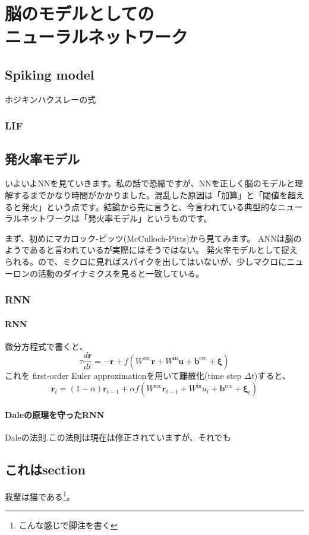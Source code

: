 \documentclass[11pt,dvipdfmx,b5paper,oneside]{jsbook}
\begin{document}
\chapter{脳のモデルとしての\\ニューラルネットワーク}
\section{Spiking model}
ホジキンハクスレーの式
\subsection{LIF}

\section{発火率モデル}
いよいよNNを見ていきます。私の話で恐縮ですが、NNを正しく脳のモデルと理解するまでかなり時間がかかりました。混乱した原因は「加算」と「閾値を超えると発火」という点です。結論から先に言うと、今言われている典型的なニューラルネットワークは「発火率モデル」というものです。\par
まず、初めにマカロック-ピッツ(McCulloch-Pitts)から見てみます。
ANNは脳のようであると言われているが実際にはそうではない。
発火率モデルとして捉えられる。ので、ミクロに見ればスパイクを出してはいないが、少しマクロにニューロンの活動のダイナミクスを見ると一致している。

\subsection{RNN}
\subsubsection{RNN}
微分方程式で書くと、
$$
\tau \frac{d \boldsymbol{r}}{dt}=-\boldsymbol{r}+f(W^{\text{rec}}\boldsymbol{r}+W^{\text{in}}\boldsymbol{u}+\boldsymbol{b}^{\text{rec}}+\boldsymbol{\xi})
$$
これを first-order Euler approximationを用いて離散化(time step $\Delta t$)すると、
$$
\boldsymbol{r}_t=(1-\alpha) \boldsymbol{r}_{t-1}+\alpha f(W^{\text{rec}}\boldsymbol{r}_{t-1}+W^{\text{in}}u_{t}+\boldsymbol{b}^{\text{rec}}+\boldsymbol{\xi}_t)
$$


\subsubsection{Daleの原理を守ったRNN}
Daleの法則.この法則は現在は修正されていますが、それでも

\section{これはsection}
我輩は猫である\footnote{こんな感じで脚注を書く}。
\end{document}
